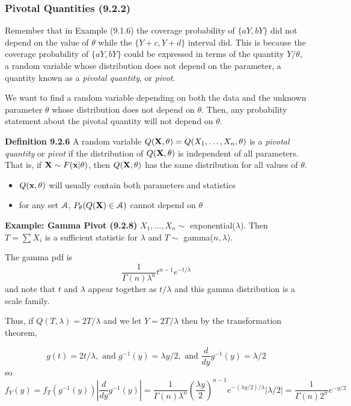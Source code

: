 \documentclass[11pt,]{article}
\newcommand{\Xndots}{X_1, \ldots, X_n}
\def\bx{{\bf x}}
\def\bX{{\bf X}}
\def\Asc{{\cal A}}
\begin{document}
\subsubsection{Pivotal Quantities (9.2.2)}

Remember that in Example (9.1.6) the coverage probability of
\(\{aY, bY\}\) did not depend on the value of \(\theta\) while the
\(\{Y+c, Y+d\}\) interval did. This is because the coverage probability
of \(\{aY, bY\}\) could be expressed in terms of the quantity
\(Y/\theta\), a random variable whose distribution does not depend on
the parameter, a quantity known as a \emph{pivotal quantity}, or
\emph{pivot}.

We want to find a random variable depending on both the data and the
unknown parameter \(\theta\) whose distribution does not depend on
\(\theta\). Then, any probability statement about the pivotal quantity
will not depend on \(\theta\).

\noindent\textbf{Definition 9.2.6} A random variable
\(Q(\bX, \theta) = Q(\Xndots, \theta)\) is a \emph{pivotal quantity} or
\emph{pivot} if the distribution of \(Q(\bX, \theta)\) is independent of
all parameters. That is, if \(\bX \sim F(\bx |\theta)\), then
\(Q(\bX, \theta)\) has the same distribution for all values of
\(\theta\).

\begin{itemize}
\item $Q(\bx, \theta)$ will usually contain both parameters and statistics
\item for any set $\Asc$, $P_\theta(Q(\bX) \in \Asc)$ cannot depend on $\theta$
\end{itemize}

\noindent\textbf{Example: Gamma Pivot (9.2.8)} \(\Xndots \sim\)
exponential(\(\lambda\)). Then \(T = \sum X_i\) is a sufficient
statistic for \(\lambda\) and \(T\sim\) gamma(\(n,\lambda\)).

The gamma pdf is
\[\frac{1}{\Gamma(n) \lambda^{n}} t^{n-1} e^{-t/\lambda}\] and note that
\(t\) and \(\lambda\) appear together as \(t/\lambda\) and this gamma
distribution is a scale family.

Thus, if \(Q(T, \lambda) = 2T/\lambda\) and we let \(Y = 2T/\lambda\)
then by the transformation theorem,

\[g(t) = 2t/\lambda, \mbox{ and } g^{-1}(y) = \lambda y /2, \mbox{ and } \frac{d}{dy}g^{-1}(y) = \lambda/2\]
so
\[f_Y(y) = f_T(g^{-1}(y)) \left| \frac{d}{dy}g^{-1}(y)\right| = \frac{1}{\Gamma(n) \lambda^{n}} \left(\frac{\lambda y}{2}\right)^{n-1} e^{-(\lambda y /2)/\lambda} | \lambda/2| = \frac{1}{\Gamma(n)2^n} e^{-y/2}\]
\end{document}
